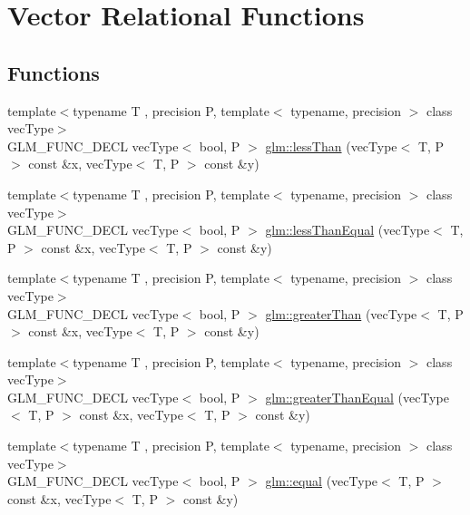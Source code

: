 \hypertarget{group__core__func__vector__relational}{}\section{Vector Relational Functions}
\label{group__core__func__vector__relational}
\subsection*{Functions}
\begin{DoxyCompactItemize}
\item 
{\footnotesize template$<$typename T , precision P, template$<$ typename, precision $>$ class vec\+Type$>$ }\\G\+L\+M\+\_\+\+F\+U\+N\+C\+\_\+\+D\+E\+CL vec\+Type$<$ bool, P $>$ \hyperlink{group__core__func__vector__relational_ga6261970937a70b0b747ae0d3ade1c188}{glm\+::less\+Than} (vec\+Type$<$ T, P $>$ const \&x, vec\+Type$<$ T, P $>$ const \&y)
\item 
{\footnotesize template$<$typename T , precision P, template$<$ typename, precision $>$ class vec\+Type$>$ }\\G\+L\+M\+\_\+\+F\+U\+N\+C\+\_\+\+D\+E\+CL vec\+Type$<$ bool, P $>$ \hyperlink{group__core__func__vector__relational_gaaf1d88119f11200c32011de7c5ec0102}{glm\+::less\+Than\+Equal} (vec\+Type$<$ T, P $>$ const \&x, vec\+Type$<$ T, P $>$ const \&y)
\item 
{\footnotesize template$<$typename T , precision P, template$<$ typename, precision $>$ class vec\+Type$>$ }\\G\+L\+M\+\_\+\+F\+U\+N\+C\+\_\+\+D\+E\+CL vec\+Type$<$ bool, P $>$ \hyperlink{group__core__func__vector__relational_gadd80263161a308462d3e3e287e79cccd}{glm\+::greater\+Than} (vec\+Type$<$ T, P $>$ const \&x, vec\+Type$<$ T, P $>$ const \&y)
\item 
{\footnotesize template$<$typename T , precision P, template$<$ typename, precision $>$ class vec\+Type$>$ }\\G\+L\+M\+\_\+\+F\+U\+N\+C\+\_\+\+D\+E\+CL vec\+Type$<$ bool, P $>$ \hyperlink{group__core__func__vector__relational_gaee7e101f8cc4ea43924f14dcdeb2ef26}{glm\+::greater\+Than\+Equal} (vec\+Type$<$ T, P $>$ const \&x, vec\+Type$<$ T, P $>$ const \&y)
\item 
{\footnotesize template$<$typename T , precision P, template$<$ typename, precision $>$ class vec\+Type$>$ }\\G\+L\+M\+\_\+\+F\+U\+N\+C\+\_\+\+D\+E\+CL vec\+Type$<$ bool, P $>$ \hyperlink{group__core__func__vector__relational_ga39c80d8baf49b0ce69f2bb22d45b3801}{glm\+::equal} (vec\+Type$<$ T, P $>$ const \&x, vec\+Type$<$ T, P $>$ const \&y)

\end{DoxyCompactItemize}
